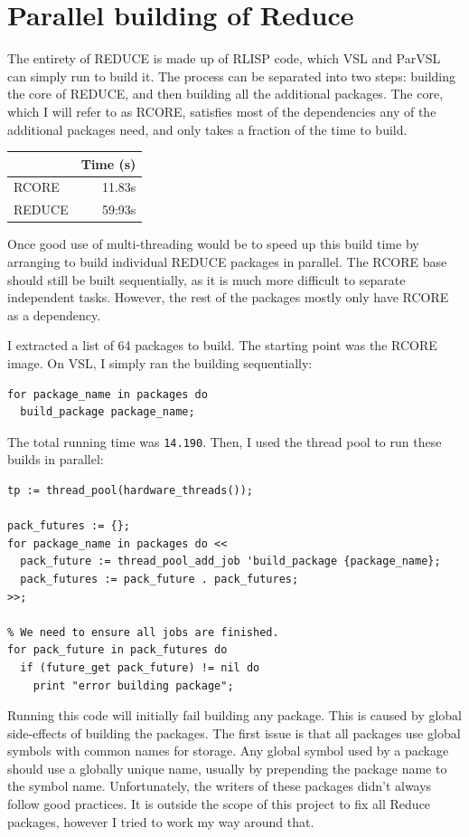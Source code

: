 \section{Parallel building of Reduce}

The entirety of REDUCE is made up of RLISP code, which VSL and ParVSL
can simply run to build it. The process can be separated into two steps:
building the core of REDUCE, and then building all the additional packages.
The core, which I will refer to as RCORE, satisfies most of the dependencies
any of the additional packages need, and only takes a fraction of the time
to build.

\begin{center}
\begin{tabular}{lr}
 & Time (s)\\
\hline
RCORE & 11.83s\\
REDUCE & 59:93s\\
\end{tabular}
\end{center}

Once good use of multi-threading would be to speed up this build time by
arranging to build individual REDUCE packages in parallel. The RCORE base
should still be built sequentially, as it is much more difficult to
separate independent tasks. However, the rest of the packages mostly
only have RCORE as a dependency.

I extracted a list of 64 packages to build. The starting point was the
RCORE image. On VSL, I simply ran the building sequentially:

\begin{verbatim}
for package_name in packages do
  build_package package_name;
\end{verbatim}

The total running time was \texttt{14.190}. Then, I used the thread pool
to run these builds in parallel:

\begin{verbatim}
tp := thread_pool(hardware_threads());

pack_futures := {};
for package_name in packages do <<
  pack_future := thread_pool_add_job 'build_package {package_name};
  pack_futures := pack_future . pack_futures;
>>;

% We need to ensure all jobs are finished.
for pack_future in pack_futures do
  if (future_get pack_future) != nil do
    print "error building package";
\end{verbatim}

Running this code will initially fail building any package. This is caused
by global side-effects of building the packages. The first issue is that all
packages use global symbols with common names for storage. Any global
symbol used by a package should use a globally unique name, usually by prepending
the package name to the symbol name. Unfortunately, the writers of these packages
didn't always follow good practices. It is outside the scope of this project to
fix all Reduce packages, however I tried to work my way around that.

